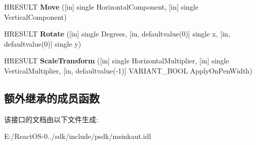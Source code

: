 \begin{DoxyCompactItemize}
\item 
\mbox{\label{interface_m_s_i_n_k_a_u_t_lib_1_1_i_ink_renderer_aafe0a029b338ae869e29e12d91a22d17}} 
H\+R\+E\+S\+U\+LT {\bfseries Move} (\mbox{[}in\mbox{]} single Horizontal\+Component, \mbox{[}in\mbox{]} single Vertical\+Component)
\item 
\mbox{\label{interface_m_s_i_n_k_a_u_t_lib_1_1_i_ink_renderer_aebbe890f0255735ca4bfb5e49cef7c52}} 
H\+R\+E\+S\+U\+LT {\bfseries Rotate} (\mbox{[}in\mbox{]} single Degrees, \mbox{[}in, defaultvalue(0)\mbox{]} single x, \mbox{[}in, defaultvalue(0)\mbox{]} single y)
\item 
\mbox{\label{interface_m_s_i_n_k_a_u_t_lib_1_1_i_ink_renderer_aba53cbd9baa641e0b6af00aa96381cc8}} 
H\+R\+E\+S\+U\+LT {\bfseries Scale\+Transform} (\mbox{[}in\mbox{]} single Horizontal\+Multiplier, \mbox{[}in\mbox{]} single Vertical\+Multiplier, \mbox{[}in, defaultvalue(-\/1)\mbox{]} V\+A\+R\+I\+A\+N\+T\+\_\+\+B\+O\+OL Apply\+On\+Pen\+Width)
\end{DoxyCompactItemize}
\subsection*{额外继承的成员函数}


该接口的文档由以下文件生成\+:\begin{DoxyCompactItemize}
\item 
E\+:/\+React\+O\+S-\/0../sdk/include/psdk/msinkaut.\+idl\end{DoxyCompactItemize}
